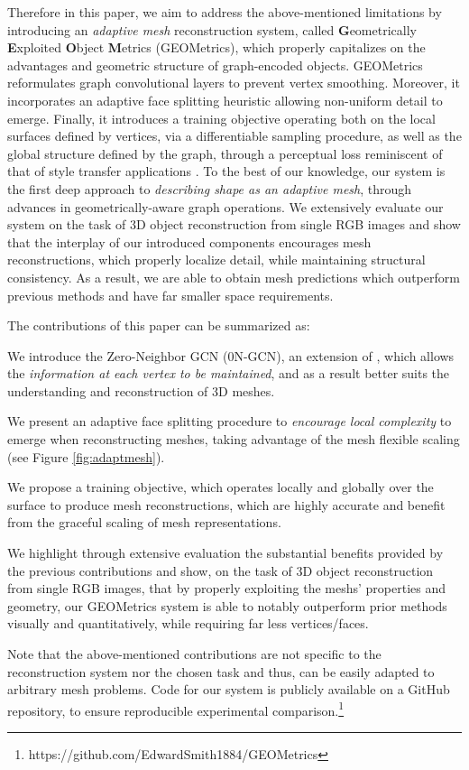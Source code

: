 \documentclass{article}
\begin{document}
Therefore in this paper, we aim to address the above-mentioned limitations by introducing an \emph{adaptive mesh} reconstruction system, called \textbf{G}eometrically \textbf{E}xploited \textbf{O}bject \textbf{M}etrics (GEOMetrics), which properly capitalizes on the advantages and geometric structure of graph-encoded objects. GEOMetrics reformulates graph convolutional layers to prevent vertex smoothing. Moreover, it incorporates an adaptive face splitting heuristic allowing non-uniform detail to emerge. Finally, it introduces a training objective operating both on the local surfaces defined by vertices, via a differentiable sampling procedure, as well as the global structure defined by the graph, through a perceptual loss reminiscent of that of style transfer applications \cite{gatys2016image,johnson2016perceptual}. To the best of our knowledge, our system is the first deep approach to \emph{describing shape as an adaptive mesh}, through advances in geometrically-aware graph operations. We extensively evaluate our system on the task of 3D object reconstruction from single RGB images and show that the interplay of our introduced components encourages mesh reconstructions, which properly localize detail, while maintaining structural consistency. As a result, we are able to obtain mesh predictions which outperform previous methods and have far smaller space requirements. 


The contributions of this paper can be summarized as:

\begin{compactitem}
   
    \item We introduce the Zero-Neighbor GCN (0N-GCN), an extension of \citet{GCN}, which allows the \emph{information at each vertex to be maintained}, and as a result better suits the understanding and reconstruction of 3D meshes. 
    \item We present an adaptive face splitting procedure to \emph{encourage local complexity} to emerge when reconstructing meshes, taking advantage of the mesh flexible scaling (see Figure \ref{fig:adaptmesh}). 
    \item We propose a training objective, which operates locally and globally over the surface to produce mesh reconstructions, which are highly accurate and benefit from the graceful scaling of mesh representations. 
   \item We highlight through extensive evaluation the substantial benefits provided by the previous contributions and show, on the task of 3D object reconstruction from single RGB images, that by properly exploiting the meshs' properties and geometry, our GEOMetrics system is able to notably outperform prior methods visually and quantitatively, while requiring far less vertices/faces. 
\end{compactitem}
Note that the above-mentioned contributions are not specific to the reconstruction system nor the chosen task and thus, can be easily adapted to arbitrary mesh problems. Code for our system is publicly available on a GitHub repository, to ensure reproducible experimental comparison.\footnote{\small https://github.com/EdwardSmith1884/GEOMetrics} 
\end{document}
